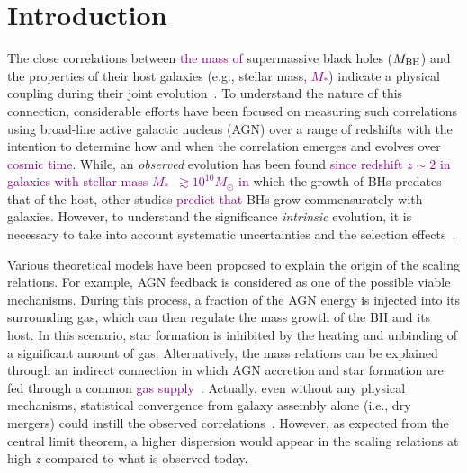 \documentclass[twocolumn]{aastex631}
\newcommand{\red}[1]{\textcolor{purple}{#1}}
\def\smass{{$M_*$}}
\def\mbh{$M_{\rm BH}$}
\begin{document}
\section{Introduction} \label{sec:intro}
The close correlations between \red{the mass of} supermassive black holes (\red{\mbh}) and the properties of their host galaxies (e.g., stellar mass\red{, \smass}) indicate a physical coupling during their joint evolution~\citep{Mag++98, F+M00, M+H03, H+R04, Gul++09}. To understand the nature of this connection, considerable efforts have been focused on measuring such correlations using broad-line active galactic nucleus (AGN) over a range of redshifts with the intention to determine how and when the correlation emerges and evolves over \red{cosmic time}. While, an {\it observed} evolution has been found \red{since redshift $z\sim2$ in galaxies with stellar mass \smass\ $\gtrsim 10^{10}M_{\odot}$ \citep[e.g.,][]{Tre++04, Peng2006a,Tre++07,Woo++08,Bennert11,Park15} in} which the growth of BHs predates that of the host, other studies \red{\citep[e.g.,][]{Schramm2013, Sun2015} predict that} BHs grow commensurately with galaxies.
However, to understand the significance {\it intrinsic} evolution, it is necessary to take into account systematic uncertainties and the selection effects~\citep{Tre++07, Lauer2007, Schulze2014, Park15,Jahnke2009,  Ding2020,Li2021b}. 

Various theoretical models have been proposed to explain the origin of the scaling relations. For example, AGN feedback is considered as one of the possible viable mechanisms. During this process, a fraction of the AGN energy is injected into its surrounding gas, which can then regulate the mass growth of the BH and its host. In this scenario, star formation is inhibited by the heating and unbinding of a significant amount of gas. Alternatively, the mass relations can be explained through an indirect connection in which AGN accretion and star formation are fed through a common \red{gas supply~\citep{Cen2015, Menci2016, angles_black_2017}. }Actually, even without any physical mechanisms, statistical convergence from galaxy assembly alone (i.e., dry mergers) could instill the observed correlations~\citep{Peng2007, Jahnke2011, Hirschmann2010}. However, as expected from the central limit theorem, a higher dispersion would appear in the scaling relations at high-$z$ compared to what is observed today. 
\end{document}
